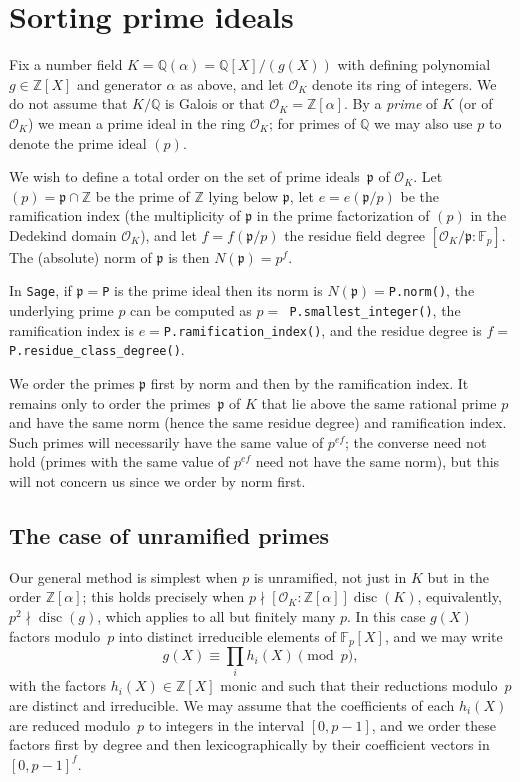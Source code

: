 \documentclass{article}
\def\Sage{{\tt Sage}}
\def\Z{{\mathbb Z}}
\def\Q{{\mathbb Q}}
\def\F{{\mathbb F}}
\def\Fp{{\mathbb F}_p}
\def\OO{{\mathcal O}}
\def\p{{\mathfrak p}}
\DeclareMathOperator{\disc}{disc}
\begin{document}
\section{Sorting prime ideals}\label{sec:primes}
Fix a number field $K=\Q(\alpha)=\Q[X]/(g(X))$ with defining polynomial
$g\in\Z[X]$ and generator $\alpha$ as above, and let $\OO_K$ denote its ring of integers.
We do not assume that $K/\Q$ is Galois or that $\OO_K=\Z[\alpha]$.
By a \emph{prime} of $K$ (or of $\OO_K$) we mean a prime ideal in the ring $\OO_K$; for primes of $\Q$ we may also use $p$ to denote the prime ideal $(p)$.

We wish to define a total order on the set of prime ideals~$\p$
of $\OO_K$.  Let $(p)=\p\cap \Z$ be the prime of $\Z$ lying below $\p$,
let $e=e(\p/p)$ be the ramification index (the multiplicity of $\p$ in the prime factorization of $(p)$ in the Dedekind domain $\OO_K$), and let $f=f(\p/p)$ the residue field degree $[\OO_K/\p:\F_p]$.
The (absolute) norm of $\p$ is then $N(\p)=p^f$.

In \Sage, if $\p=${\tt P} is the prime ideal then its norm is
$N(\p)=${\tt P.norm()}, the underlying prime $p$ can be computed as $p=${\tt
 P.smallest\_integer()}, the
ramification index is $e=${\tt P.ramification\_index()}, and the residue degree is $f=${\tt
  P.residue\_class\_degree()}.

We order the primes $\p$ first by norm and then by the ramification index.
It remains only to order the primes~$\p$ of $K$ that lie above the same rational prime $p$ and have the same norm (hence the same residue degree) and ramification index.  Such primes will necessarily have the same value of $p^{ef}$; the converse need not hold (primes with the same value of $p^{ef}$ need not have the same norm), but this will not concern us since we order by norm first.

\subsection{The case of unramified primes}

Our general method is simplest when $p$ is unramified, not just in $K$
but in the order $\Z[\alpha]$; this holds precisely when $p\nmid [\OO_K:\Z[\alpha]]\disc(K)$, equivalently, $p^2\nmid\disc(g)$, which applies to all but finitely many $p$.  In this case $g(X)$ factors modulo~$p$ into distinct irreducible elements of $\Fp[X]$, and we may
write
\[
    g(X) \equiv \prod_i h_i(X) \pmod{p},
\]
with the factors $h_i(X)\in\Z[X]$ monic and such that their reductions
modulo~$p$ are distinct and irreducible.  We may assume that the
coefficients of each $h_i(X)$ are reduced modulo~$p$ to integers in the interval $[0,p-1]$, and we order these factors first by degree and then lexicographically by their coefficient vectors in $[0,p-1]^f$.
\end{document}
